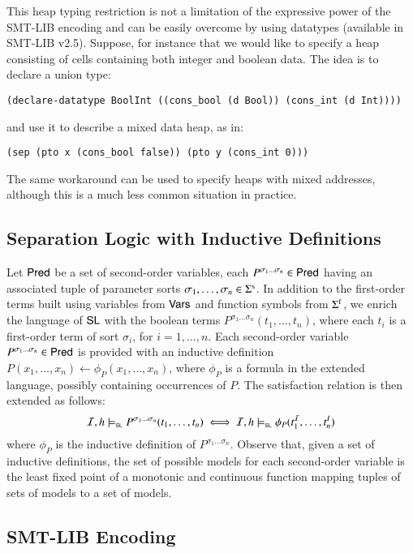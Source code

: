 \documentclass{llncs}
\begin{document}
This heap typing restriction is not a limitation of the expressive
power of the SMT-LIB encoding and can be easily overcome by using
datatypes (available in SMT-LIB v2.5). Suppose, for instance that we
would like to specify a heap consisting of cells containing both
integer and boolean data. The idea is to declare a union type: 
\begin{verbatim}
(declare-datatype BoolInt ((cons_bool (d Bool)) (cons_int (d Int))))
\end{verbatim}
and use it to describe a mixed data heap, as in: 
\begin{verbatim}
(sep (pto x (cons_bool false)) (pto y (cons_int 0)))
\end{verbatim}
The same workaround can be used to specify heaps with mixed addresses,
although this is a much less common situation in practice. 

\subsection{Separation Logic with Inductive Definitions}

Let $\mathsf{Pred}$ be a set of second-order variables, each $P^{\sigma_1
  \ldots \sigma_n} \in \mathsf{Pred}$ having an associated tuple of parameter
sorts $\sigma_1, \ldots, \sigma_n \in \Sigma^\mathrm{s}$. In addition to
the first-order terms built using variables from $\mathsf{Vars}$ and function
symbols from $\Sigma^\mathrm{f}$, we enrich the language of $\mathsf{SL}$
with the boolean terms $P^{\sigma_1 \ldots \sigma_n}(t_1, \ldots,
t_n)$, where each $t_i$ is a first-order term of sort $\sigma_i$, for
$i=1,\ldots,n$. Each second-order variable $P^{\sigma_1 \ldots
  \sigma_n} \in \mathsf{Pred}$ is provided with an inductive definition
$P(x_1,\ldots,x_n) \leftarrow \phi_P(x_1,\ldots,x_n)$, where $\phi_P$
is a formula in the extended language, possibly containing occurrences
of $P$. The satisfaction relation is then extended as follows:
\[\mathcal{I},h \models_{\mathsf{\scriptscriptstyle{SL}}} P^{\sigma_1 \ldots \sigma_n}(t_1,\ldots,t_n) \iff 
\mathcal{I},h \models_{\mathsf{\scriptscriptstyle{SL}}} \phi_P(t^{\mathcal{I}}_1,\ldots,t^I_n)\] where
$\phi_P$ is the inductive definition of $P^{\sigma_1 \ldots
  \sigma_n}$. Observe that, given a set of inductive definitions, the
set of possible models for each second-order variable is the least
fixed point of a monotonic and continuous function mapping tuples of
sets of models to a set of models.

\subsection{SMT-LIB Encoding}
\end{document}
